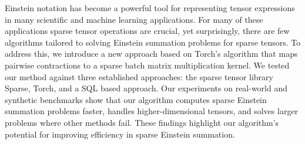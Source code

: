 Einstein notation has become a powerful tool for representing tensor expressions in many scientific and
machine learning applications. For many of these applications sparse tensor operations are crucial,
yet surprisingly, there are few algorithms tailored to solving Einstein summation problems for sparse tensors.
To address this, we introduce a new approach based on Torch's algorithm that maps pairwise contractions
to a sparse batch matrix multiplication kernel. We tested our method against three established approaches:
the sparse tensor library Sparse, Torch, and a SQL based approach. Our experiments on real-world and
synthetic benchmarks show that our algorithm computes sparse Einstein summation problems faster, handles
higher-dimensional tensors, and solves larger problems where other methods fail. These findings highlight
our algorithm's potential for improving efficiency in sparse Einstein summation.